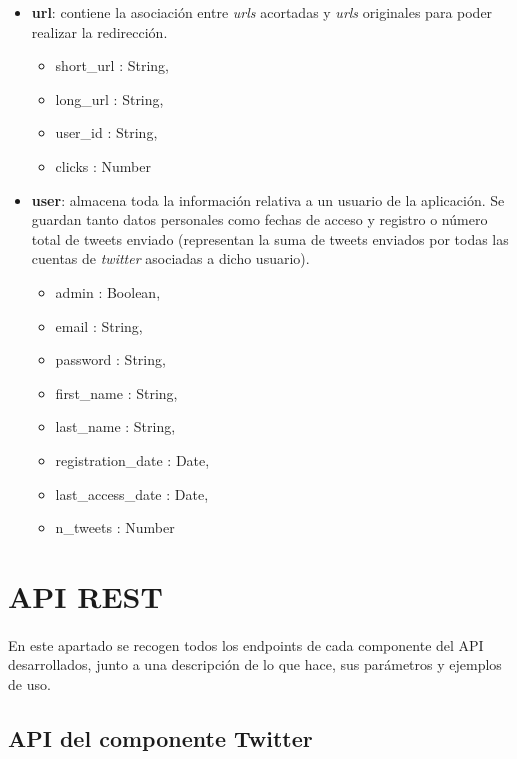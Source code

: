 \documentclass[a4paper]{article}
\begin{document}
\begin{itemize}
	\item \textbf{url}: contiene la asociación entre \textit{urls} acortadas y \textit{urls} originales para poder realizar la redirección.
	
		\begin{itemize}
		\item short\_url : String,
		\item long\_url : String,
		\item user\_id : String,
		\item clicks : Number
		\end{itemize}
	
	\item \textbf{user}: almacena toda la información relativa a un usuario de la aplicación. Se guardan tanto datos personales como fechas de acceso y registro o número total de tweets enviado (representan la suma de tweets enviados por todas las cuentas de \textit{twitter} asociadas a dicho usuario).
	
		\begin{itemize}
		\item admin : Boolean,
		\item email : String,
		\item password : String,
		\item first\_name : String,
		\item last\_name : String,
		\item registration\_date : Date,
		\item last\_access\_date : Date,
		\item n\_tweets : Number		
		\end{itemize}
	
	\end{itemize}

\newpage
\section{API REST}

	\paragraph{} En este apartado se recogen todos los endpoints de cada componente del API desarrollados, junto a una descripción de lo que hace, sus parámetros y ejemplos de uso.
	
	\subsection{API del componente Twitter}
	
\end{document}
